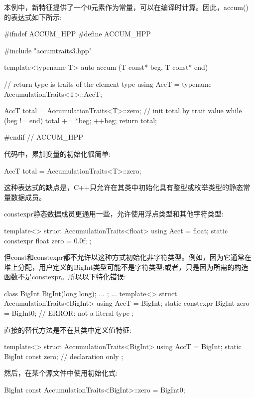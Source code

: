 本例中，新特征提供了一个0元素作为常量，可以在编译时计算。因此，accum()的表达式如下所示:

\begin{cpp}
#ifndef ACCUM_HPP
#define ACCUM_HPP

#include "accumtraits3.hpp"

template<typename T>
auto accum (T const* beg, T const* end)
{
	// return type is traits of the element type
	using AccT = typename AccumulationTraits<T>::AccT;
	
	AccT total = AccumulationTraits<T>::zero; // init total by trait value
	while (beg != end) {
		total += *beg;
		++beg;
	}
	return total;
}

#endif // ACCUM_HPP
\end{cpp}

代码中，累加变量的初始化很简单:

\begin{cpp}
AccT total = AccumulationTraits<T>::zero;
\end{cpp}

这种表达式的缺点是，C++只允许在其类中初始化具有整型或枚举类型的静态常量数据成员。

constexpr静态数据成员更通用一些，允许使用浮点类型和其他字符类型:

\begin{cpp}
template<>
struct AccumulationTraits<float> {
	using Acct = float;
	static constexpr float zero = 0.0f;
};
\end{cpp}

但const和constexpr都不允许以这种方式初始化非字符类型。例如，因为它通常在堆上分配，用户定义的BigInt类型可能不是字符类型;或者，只是因为所需的构造函数不是constexpr。所以以下特化错误:

\begin{cpp}
class BigInt {
	BigInt(long long);
	...
};
...
template<>
struct AccumulationTraits<BigInt> {
	using AccT = BigInt;
	static constexpr BigInt zero = BigInt{0}; // ERROR: not a literal type
};
\end{cpp}

直接的替代方法是不在其类中定义值特征:

\begin{cpp}
template<>
struct AccumulationTraits<BigInt> {
	using AccT = BigInt;
	static BigInt const zero; // declaration only
};
\end{cpp}

然后，在某个源文件中使用初始化式:

\begin{cpp}
BigInt const AccumulationTraits<BigInt>::zero = BigInt{0};
\end{cpp}

